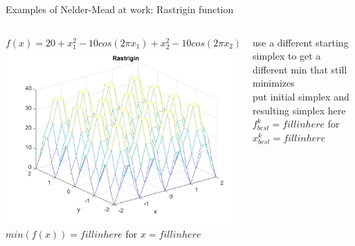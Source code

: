 \documentclass{beamer}
\begin{document}
\begin{frame}{Examples of Nelder-Mead at work: Rastrigin function}
\begin{columns}
\begin{column}{0.49\linewidth}
	\small $f(x) = 20 + x_1^2 - 10cos(2\pi x_1) + x_2^2 - 10cos(2\pi x_2)$ \\
	\includegraphics[width=0.95\linewidth]{rastriginPlotS1}	\\
	$min(f(x))= fill in here $ for $x= fill in here$
\end{column}
\begin{column}{0.49\linewidth}
	use a different starting simplex to get a different min that still minimizes \\
	put initial simplex and resulting simplex here \\
	$f^k_{best}= fill in here $ for $x^k_{best}= fill in here$
\end{column}
\end{columns}
\end{frame}
\end{document}
